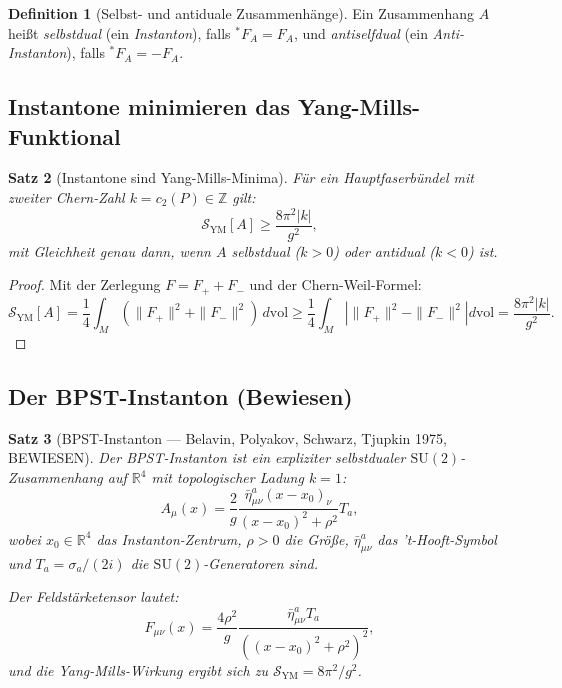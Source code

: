 \documentclass[12pt,a4paper]{amsart}
\newtheorem{theorem}{Satz}[section]
\theoremstyle{definition}
\newtheorem{definition}[theorem]{Definition}
\theoremstyle{remark}
\begin{document}
\begin{definition}[Selbst- und antiduale Zusammenhänge]
Ein Zusammenhang $A$ heißt \emph{selbstdual} (ein \emph{Instanton}), falls ${}^*F_A = F_A$,
und \emph{antiselfdual} (ein \emph{Anti-Instanton}), falls ${}^*F_A = -F_A$.
\end{definition}

\subsection{Instantone minimieren das Yang-Mills-Funktional}

\begin{theorem}[Instantone sind Yang-Mills-Minima]
\label{satz:instanton-minimum}
Für ein Hauptfaserbündel mit zweiter Chern-Zahl $k = c_2(P) \in \mathbb{Z}$ gilt:
\[
  \mathcal{S}_{\mathrm{YM}}[A] \geq \frac{8\pi^2 |k|}{g^2},
\]
mit Gleichheit genau dann, wenn $A$ selbstdual ($k > 0$) oder antidual ($k < 0$) ist.
\end{theorem}

\begin{proof}
Mit der Zerlegung $F = F_+ + F_-$ und der Chern-Weil-Formel:
\[
  \mathcal{S}_{\mathrm{YM}}[A] = \frac{1}{4} \int_M (\|F_+\|^2 + \|F_-\|^2) \, d\mathrm{vol}
  \geq \frac{1}{4} \int_M \left| \|F_+\|^2 - \|F_-\|^2 \right| d\mathrm{vol}
  = \frac{8\pi^2|k|}{g^2}.
\]
\end{proof}

\subsection{Der BPST-Instanton (Bewiesen)}

\begin{theorem}[BPST-Instanton — Belavin, Polyakov, Schwarz, Tjupkin 1975, BEWIESEN]
\label{satz:bpst}
Der \emph{BPST-Instanton} ist ein expliziter selbstdualer $\mathrm{SU}(2)$-Zusammenhang
auf $\mathbb{R}^4$ mit topologischer Ladung $k = 1$:
\[
  A_\mu(x) = \frac{2}{g} \frac{\bar{\eta}^a_{\mu\nu} (x - x_0)_\nu}{(x - x_0)^2 + \rho^2} T_a,
\]
wobei $x_0 \in \mathbb{R}^4$ das Instanton-Zentrum, $\rho > 0$ die Größe,
$\bar{\eta}^a_{\mu\nu}$ das 't-Hooft-Symbol und $T_a = \sigma_a/(2i)$ die
$\mathrm{SU}(2)$-Generatoren sind.

Der Feldstärketensor lautet:
\[
  F_{\mu\nu}(x) = \frac{4\rho^2}{g} \frac{\bar{\eta}^a_{\mu\nu} T_a}{((x-x_0)^2 + \rho^2)^2},
\]
und die Yang-Mills-Wirkung ergibt sich zu $\mathcal{S}_{\mathrm{YM}} = 8\pi^2/g^2$.
\end{theorem}
\end{document}
